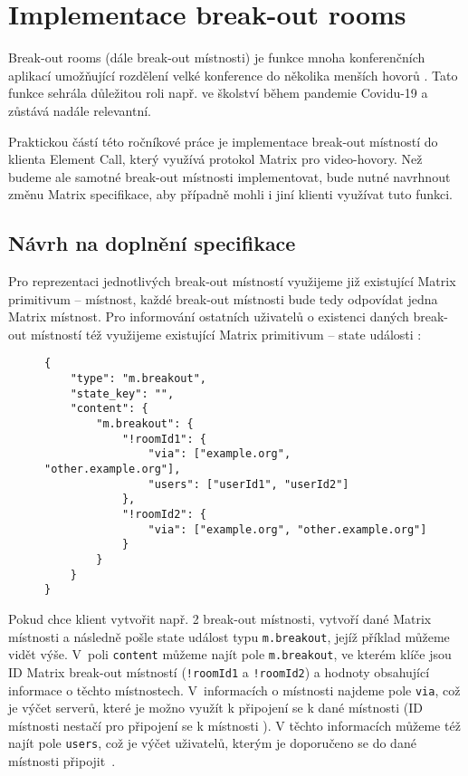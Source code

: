 \section{Implementace break-out rooms}\label{breakoutRooms}

Break-out rooms (dále break-out místnosti) je funkce mnoha konferenčních
aplikací umožňující rozdělení velké konference do několika menších hovorů
\parencite{Zoom-EnablingMeetingBreakoutRooms,Microsoft-UseBreakoutRoomsInMSTeamsMeetings}.
Tato funkce sehrála důležitou roli např. ve školství během pandemie Covidu-19
\parencite{AhmedKhalid-TheImpactOfUtilizingBreakoutRooms,Agustina-ZoomBreakoutRoomsForStudents}
a zůstává nadále relevantní.

Praktickou částí této ročníkové práce je implementace break-out místností do
klienta Element Call, který využívá protokol Matrix pro video-hovory. Než budeme
ale samotné break-out místnosti implementovat, bude nutné navrhnout změnu Matrix
specifikace, aby případně mohli i jiní klienti využívat tuto funkci.

\subsection{Návrh na doplnění specifikace}\label{breakoutRoomsMSC}

Pro reprezentaci jednotlivých break-out místností využijeme již existující
Matrix primitivum -- místnost, každé break-out místnosti bude tedy odpovídat
jedna Matrix místnost. Pro informování ostatních uživatelů o existenci daných
break-out místností též využijeme existující Matrix primitivum -- state události
\parencite{GitHub-MSC3985}:

\begin{figure}[H]
    \begin{verbatim}
{
	"type": "m.breakout",
	"state_key": "",
	"content": {
		"m.breakout": {
			"!roomId1": {
				"via": ["example.org", "other.example.org"],
				"users": ["userId1", "userId2"]
			},
			"!roomId2": {
				"via": ["example.org", "other.example.org"]
			}
		}
	}
}
	\end{verbatim}
\end{figure}

Pokud chce klient vytvořit např. 2 break-out místnosti, vytvoří dané Matrix
místnosti a následně pošle state událost typu \texttt{m.breakout},
jejíž příklad můžeme vidět výše. V~poli \texttt{content} můžeme najít
pole \texttt{m.breakout}, ve kterém klíče jsou ID Matrix break-out
místností (\texttt{!roomId1} a \texttt{!roomId2}) a hodnoty
obsahující informace o těchto místnostech. V~informacích o místnosti najdeme
pole \texttt{via}, což je výčet serverů, které je možno využít k
připojení se k dané místnosti (ID místnosti nestačí pro připojení se k místnosti
\parencite{MatrixORG-Spec}). V těchto informacích můžeme též najít pole
\texttt{users}, což je výčet uživatelů, kterým je doporučeno se do
dané místnosti připojit~\parencite{GitHub-MSC3985}.

